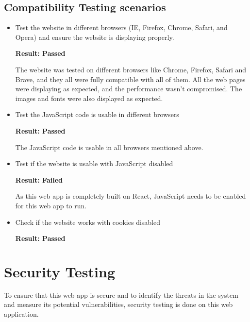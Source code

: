 \subsection{Compatibility Testing scenarios}
\begin{itemize}
    \item Test the website in different browsers (IE, Firefox, Chrome, Safari, and Opera) and ensure the website is displaying properly.

    \textbf{Result: Passed}
    
    The website was tested on different browsers like Chrome, Firefox, Safari and Brave, and they all were fully compatible with all of them. All the web pages were displaying as expected, and the performance wasn’t compromised. The images and fonts were also displayed as expected.

    \item Test the JavaScript code is usable in different browsers

    \textbf{Result: Passed}

    The JavaScript code is usable in all browsers mentioned above.

    \item Test if the website is usable with JavaScript disabled

    \textbf{Result: Failed}

    As this web app is completely built on React, JavaScript needs to be enabled for this web app to run.

    \item Check if the website works with cookies disabled

    \textbf{Result: Passed}
\end{itemize}

\newpage
\section{Security Testing}
To ensure that this web app is secure and to identify the threats in the system and measure its potential vulnerabilities, security testing is done on this web application. 


